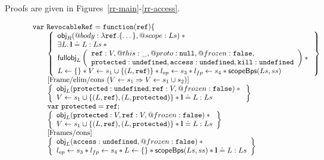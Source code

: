 \documentclass[a4paper]{article}
\begin{document}
Proofs are given in Figures~\ref{rr-main}-\ref{rr-access}.

%
\begin{figure}
\[
  \begin{array}{l}
    \jsvar{RevocableRef = function(ref) \{}\\
    \indblock{
      \logic{
        \obj_R(@body: \lambda\js{ref}.\{\dots\} , @scope: Ls) \sep {} \\
          \exists L \st \ls \doteq L:Ls \sep {} \\
          \fullobj_L\left(
            \begin{array}{l}
              \js{ref}: V,@this: \_,@proto: \nil,@frozen: \false,\\
              \js{protected}: \und,\js{access}: \und,\js{kill}: \und %
            \end{array}
          \right) \sep {} \\
          L \bp \{\} \sep V \bp s_1 \cup \{(L,\js{ref})\} \sep
          \lop \bp s_3 \sep \lfp \bp s_4 \sep
          \scopeBps(Ls, ss)
      } \\
      \step{Frame/elim/cons ($V \bp s_1 \impl V \bp s_1 \cup s_2$)} \\
      \logic{
          \obj_L(\js{protected}: \und, \js{ref}: V, @frozen: \false) \sep {} \\
          V \bp s_1 \cup \{(L,\js{ref}), (L, \js{protected})\} \sep \ls\doteq{L:Ls}
      } \\
      \jsvar{protected = ref;} \\
      \logic{
          \obj_L(\js{protected}: V, \js{ref}: V, @frozen: \false) \sep {} \\
          V \bp s_1 \cup \{(L,\js{ref}), (L, \js{protected})\}\sep \ls\doteq{L:Ls}
      } \\
      \step{Frames/cons} \\
      \logic{
          \obj_L(\js{access}: \und, @frozen: \false) \sep {} \\
        \lop \bp s_3 \sep \lfp \bp s_4 \sep
        L \bp \{\} \sep \scopeBps(Ls,ss) \sep \ls\doteq{L:Ls}
}}
\end{array}\]
\end{figure}
\end{document}
